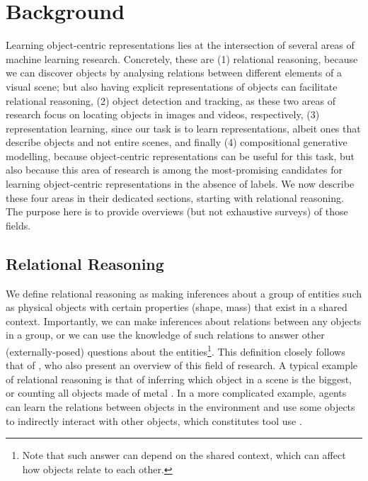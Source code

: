 \chapter{Background}
\label{ch:lit_review}

Learning object-centric representations lies at the intersection of several areas of machine learning research. 
Concretely, these are
(1) relational reasoning, because we can discover objects by analysing relations between different elements of a visual scene; but also having explicit representations of objects can facilitate relational reasoning,
(2) object detection and tracking, as these two areas of research focus on locating objects in images and videos, respectively,
(3) representation learning, since our task is to learn representations, albeit ones that describe objects and not entire scenes, and finally
(4) compositional generative modelling, because object-centric representations can be useful for this task, but also because this area of research is among the most-promising candidates for learning object-centric representations in the absence of labels.
%
We now describe these four areas in their dedicated sections, starting with relational reasoning.
The purpose here is to provide overviews (but not exhaustive surveys) of those fields.


\section{Relational Reasoning}
\label{sec:relational_reasoning}

We define relational reasoning as making inferences about a group of entities such as physical objects with certain properties (\!\eg shape, mass) that exist in a shared context.
Importantly, we can make inferences about relations between any objects in a group, or we can use the knowledge of such relations to answer other (externally-posed) questions about the entities\footnote{Note that such answer can depend on the shared context, which can affect how objects relate to each other.}.
This definition closely follows that of \cite{Battaglia2018relnets}, who also present an overview of this field of research. 
A typical example of relational reasoning is that of inferring which object in a scene is the biggest, or counting all objects made of metal \citep{Santoro2017}.
In a more complicated example, agents can learn the relations between objects in the environment and use some objects to indirectly interact with other objects, which constitutes tool use \citep{Baker2019tooluse}.

